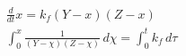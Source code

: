 \begin{align}
  \frac{d}{d t} x = k_{f} \left(Y - x\right) \left(Z - x\right) \\
  \int_{0}^{x} \frac{1}{\left(Y - \chi\right) \left(Z - \chi\right)}\, d\chi = \int_{0}^{t} k_{f}\, d\tau
\end{align}